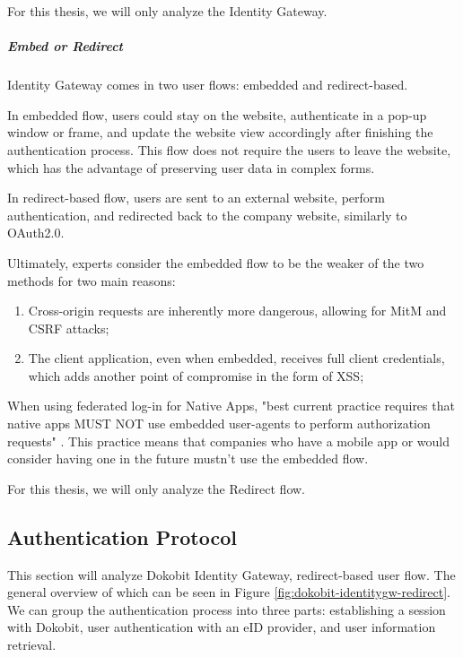 For this thesis, we will only analyze the Identity Gateway.

\subparagraph{Embed or Redirect}

Identity Gateway comes in two user flows: embedded and redirect-based.

In embedded flow, users could stay on the website, authenticate in a pop-up window or frame, and update the website view accordingly after finishing the authentication process. This flow does not require the users to leave the website, which has the advantage of preserving user data in complex forms.

In redirect-based flow, users are sent to an external website, perform authentication, and redirected back to the company website, similarly to OAuth2.0.

Ultimately, experts consider the embedded flow to be the weaker of the two methods \cite{auth0-universal-vs-embedded} for two main reasons:

\begin{enumerate}
  \item Cross-origin requests are inherently more dangerous, allowing for MitM and CSRF attacks;
  \item The client application, even when embedded, receives full client credentials, which adds another point of compromise in the form of XSS;
\end{enumerate}

When using federated log-in for Native Apps, "best current practice requires that native apps MUST NOT use embedded user-agents to perform authorization requests" \cite{rfc8252}. This practice means that companies who have a mobile app or would consider having one in the future mustn't use the embedded flow.

For this thesis, we will only analyze the Redirect flow.

\subsection{Authentication Protocol}

This section will analyze Dokobit Identity Gateway, redirect-based user flow. The general overview of which can be seen in Figure \ref{fig:dokobit-identitygw-redirect}. We can group the authentication process into three parts: establishing a session with Dokobit, user authentication with an eID provider, and user information retrieval.

